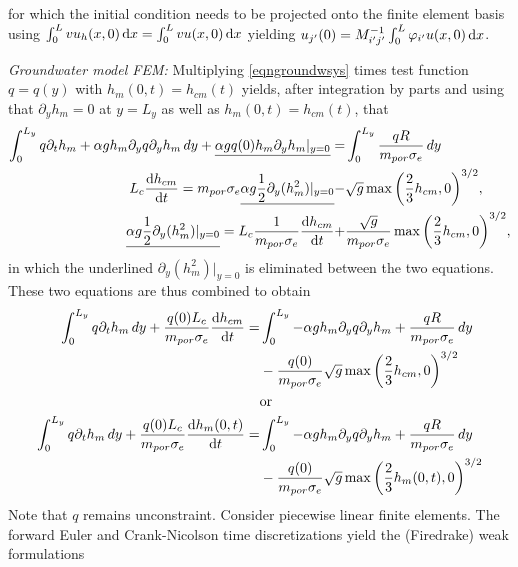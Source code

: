 \documentclass [12pt,english]{article}
\def\frac#1#2{ {#1\over#2}}
\begin{document}
for which the initial condition needs to be projected onto the finite element basis using $\int_0^L v u_h(x,0)\,{\rm d}x=\int_0^Lv u(x,0)\,{\rm d} x$
yielding $u_{j'}(0) = M_{i'j'}^{-1}\int_0^L \varphi_{i'}u(x,0)\,{\rm d} x$.

\vskip 12pt\noindent
{\em Groundwater model FEM:}
Multiplying \eqref{eqngroundwsys} times test function $q=q(y)$ with $h_m(0,t)=h_{cm}(t)$ yields, after integration by parts 
and using that $\partial_y h_m=0$ at $y=L_y$ as well as $h_m(0,t)=h_{cm}(t)$, that
\begin{align}
\int_0^{L_y}  q \partial_t h_m+\alpha g h_m \partial_y q \partial_y h_m\, dy
+\underline{\alpha g q(0) h_m\partial_y h_m|_{y=0}} 
=& \int_0^{L_y} \frac {q R}{m_{por} \sigma_e} \, dy\\
L_c \frac {{\rm d}h_{cm}}{{\rm d} t}= m_{por}\sigma_e\underline{\alpha g \frac 12 \partial_y(h_m^2)|_{y=0}}- &
\sqrt{g} \max{\left(\frac 23 h_{cm},0\right)}^{3/2},\\
\underline{\alpha g \frac 12 \partial_y(h_m^2)|_{y=0}} = L_c \frac {1}{m_{por}\sigma_e}\frac {{\rm d}h_{cm}}{{\rm d} t}
+ & \frac {\sqrt{g}}{m_{por}\sigma_e} \max{\left(\frac 23 h_{cm},0\right)}^{3/2},
\end{align}
in which the underlined $\partial_y(h_m^2)|_{y=0}$ is eliminated between the two equations.
These two equations are thus combined to obtain
\begin{align}
\int_0^{L_y}  q \partial_t h_m\, d y+\frac {q(0)  L_c}{m_{por}\sigma_e} \frac {{\rm d}h_{cm}}{{\rm d} t}
=& \int_0^{L_y} -\alpha g h_m \partial_y q \partial_y h_m+\frac {q R}{m_{por} \sigma_e} \,dy \nonumber\\
 & -\frac {q(0)}{m_{por}\sigma_e} \sqrt{g} \max{\left(\frac 23 h_{cm},0\right)}^{3/2}\\
& \textrm{or}\nonumber\\
\int_0^{L_y}  q \partial_t h_m\, d y+\frac {q(0)  L_c}{m_{por}\sigma_e} \frac {{\rm d}h_{m}(0,t)}{{\rm d} t}
=& \int_0^{L_y} -\alpha g h_m \partial_y q \partial_y h_m+\frac {q R}{m_{por} \sigma_e} \,dy \nonumber\\
 & -\frac {q(0)}{m_{por}\sigma_e} \sqrt{g} \max{\left(\frac 23 h_{m}(0,t),0\right)}^{3/2}
\end{align}
Note that $q$ remains unconstraint.
Consider piecewise linear finite elements.
The forward Euler and Crank-Nicolson time discretizations yield the (Firedrake) weak formulations
\end{document}
